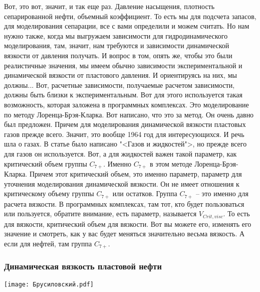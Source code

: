 \documentclass[main.tex]{subfiles}
\begin{document}
Вот, это вот, значит, и так еще раз.
Давление насыщения, плотность сепарированной нефти, объемный коэффициент.
То есть мы для подсчета запасов, для моделирования сепарации, все с вами определили и можем считать.
Но нам нужно также, когда мы выгружаем зависимости для гидродинамического моделирования, там, значит, нам требуются и зависимости динамической вязкости от давления получать.
И вопрос в том, опять же, чтобы это были реалистичные значения, мы имеем обычно зависимости экспериментальной и динамической вязкости от пластового давления.
И ориентируясь на них, мы должны...
Вот, расчетные зависимости, получаемые расчетом зависимости, должны быть близки к экспериментальным.
Вот для этого используется такая возможность, которая заложена в программных комплексах.
Это моделирование по методу Лоренца-Брэя-Кларка.
Вот написано, что это за метод.
Он очень давно был предложен.
Причем для моделирования динамической вязкости пластовых газов прежде всего.
Значит, это вообще 1964 год для интересующихся.
И речь шла о газах.
В статье было написано "<Газов и жидкостей">, но прежде всего для газов он используется.
Вот, а для жидкостей важен такой параметр, как критический объем группы $C_{7+}$.
Именно $C_{7+}$ в этом методе Лоренца-Брэя-Кларка.
Причем этот критический объем, это именно параметр, параметр для уточнения моделирования динамической вязкости.
Он не имеет отношения к критическому объему группы $C_{7+}$ или остатков.
Группа $C_{7+}$ -- это именно для расчета вязкости.
В программных комплексах, там тот, кто будет пользоваться или пользуется, обратите внимание, есть параметр, называется $V_{Crit,visc}$.
То есть для вязкости, критический объем для вязкости.
Вот вы можете его, изменять его значение и смотреть, как у вас будет меняться значительно весьма вязкость.
А если для нефтей, там группа $C_{7+}$.

\subsubsection{Динамическая вязкость пластовой нефти}

\begin{center}
\texttt{[image: Брусиловский.pdf]}
\end{center}
\end{document}
